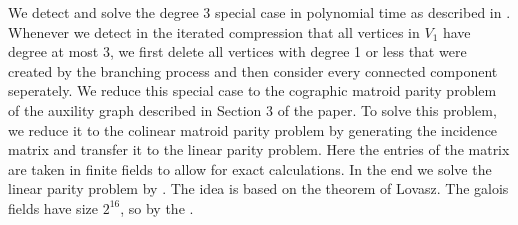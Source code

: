 \documentclass[11pt,a4paper]{scrartcl}
\begin{document}
We detect and solve the degree 3 special case in polynomial time as described in \cite{DBLP:journals/corr/abs-1004-1672}. Whenever we detect in the iterated compression that all vertices in $V_1$ have degree at most 3, we first delete all vertices with degree 1 or less that were created by the branching process and then consider every connected component seperately. We reduce this special case to the cographic matroid parity problem of the auxility graph described in Section 3 of the paper. To solve this problem, we reduce it to the colinear matroid parity problem by generating the incidence matrix and transfer it to the linear parity problem. Here the entries of the matrix are taken in finite fields to allow for exact calculations. In the end we solve the linear parity problem by \cite{Cheung:2014:AAL:2620785.2601066}. The idea is based on the theorem of Lovasz. The galois fields have size $2^{16}$, so by the .

\nocite{bafna1999}
\nocite{chen2008}


\end{document}
